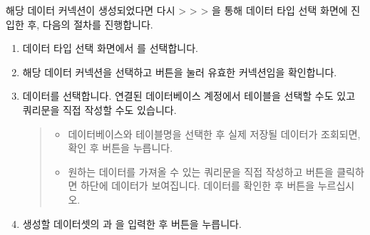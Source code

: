 \documentclass[letterpaper,10pt,english]{sphinxmanual}
\begin{document}
해당 데이터 커넥션이 생성되었다면 다시  \textgreater{}  \textgreater{}  \textgreater{} 을 통해 데이터 타입 선택 화면에 진입한 후, 다음의 절차를 진행합니다.
\begin{enumerate}
\def\theenumi{\arabic{enumi}}
\def\labelenumi{\theenumi .}
\makeatletter\def\p@enumii{\p@enumi \theenumi .}\makeatother
\item {} 
데이터 타입 선택 화면에서 를 선택합니다.

\item {} 
해당 데이터 커넥션을 선택하고  버튼을 눌러 유효한 커넥션임을 확인합니다.
\begin{quote}

\begin{figure}[H]
\centering

\noindent{}
\end{figure}
\end{quote}

\item {} 
데이터를 선택합니다. 연결된 데이터베이스 계정에서 테이블을 선택할 수도 있고 쿼리문을 직접 작성할 수도 있습니다.
\begin{quote}

\begin{figure}[H]
\centering

\noindent{}
\end{figure}
\begin{itemize}
\item {} 
 데이터베이스와 테이블명을 선택한 후 실제 저장될 데이터가 조회되면, 확인 후  버튼을 누릅니다.

\item {} 
 원하는 데이터를 가져올 수 있는 쿼리문을 직접 작성하고  버튼을 클릭하면 하단에 데이터가 보여집니다. 데이터를 확인한 후  버튼을 누르십시오.

\end{itemize}
\end{quote}

\item {} 
생성할 데이터셋의 과 을 입력한 후  버튼을 누릅니다.
\begin{quote}


\end{quote}
\end{enumerate}
\end{document}
